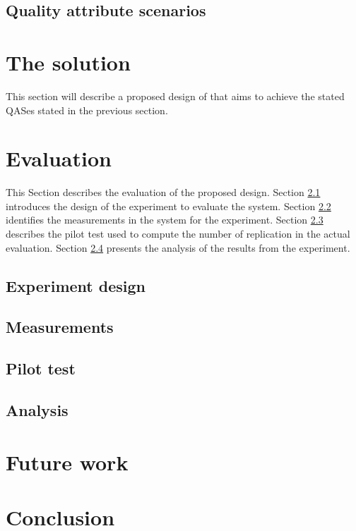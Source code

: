 \documentclass[conference]{IEEEtran}
\begin{document}
\subsection{Quality attribute scenarios}
\label{sec:qas}










\section{The solution}
\label{sec:middleware_architecture}


This section will describe a proposed design of that aims to achieve the stated QASes stated in the previous section.


 



\section{Evaluation}
\label{sec:evaluation}
This Section describes the evaluation of the proposed design.
Section \ref{sec:design} introduces the design of the experiment to evaluate the system. 
Section \ref{sec:measurements} identifies the measurements in the system for the experiment.
Section \ref{sec:pilot_test} describes the pilot test used to compute the number of replication in the actual evaluation. 
Section \ref{sec:analysis} presents the analysis of the results from the experiment. 

 
\subsection{Experiment design}
\label{sec:design}


\subsection{Measurements}
\label{sec:measurements}


\subsection{Pilot test}
\label{sec:pilot_test}

\subsection{Analysis}
\label{sec:analysis}


\section{Future work}


\section{Conclusion}




\vspace{12pt}
\end{document}
